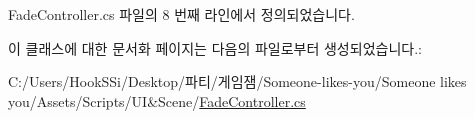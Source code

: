 Fade\+Controller.\+cs 파일의 8 번째 라인에서 정의되었습니다.



이 클래스에 대한 문서화 페이지는 다음의 파일로부터 생성되었습니다.\+:\begin{DoxyCompactItemize}
\item 
C\+:/\+Users/\+Hook\+S\+Si/\+Desktop/파티/게임잼/\+Someone-\/likes-\/you/\+Someone likes you/\+Assets/\+Scripts/\+U\+I\&\+Scene/\mbox{\hyperlink{_fade_controller_8cs}{Fade\+Controller.\+cs}}\end{DoxyCompactItemize}

